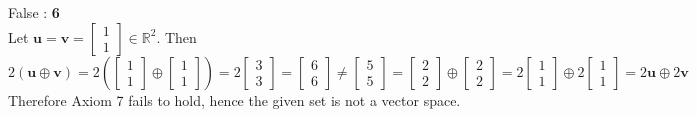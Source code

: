 False : \textbf{6} \\
Let $\textbf{u} = \textbf{v} = \begin{bmatrix}
	1 \\ 1
\end{bmatrix} \in \mathbb{R}^2$. Then \begin{equation*}
	2(\textbf{u} \oplus \textbf{v}) = 2(\begin{bmatrix}
	 1 \\ 1
	\end{bmatrix} \oplus \begin{bmatrix}
	 1 \\ 1
	\end{bmatrix}) = 2\begin{bmatrix}
	 3 \\ 3
	\end{bmatrix} = \begin{bmatrix}
	 6 \\ 6
	\end{bmatrix} \neq \begin{bmatrix}
	 5 \\ 5
	\end{bmatrix} = \begin{bmatrix}
	 2 \\ 2
	\end{bmatrix} \oplus \begin{bmatrix}
	 2 \\ 2
	\end{bmatrix} = 2\begin{bmatrix}
	 1 \\ 1
	\end{bmatrix} \oplus 2\begin{bmatrix}
	 1 \\ 1
	\end{bmatrix} = 2\textbf{u} \oplus 2\textbf{v}
\end{equation*}
Therefore Axiom 7 fails to hold, hence the given set is not a vector space. \\

